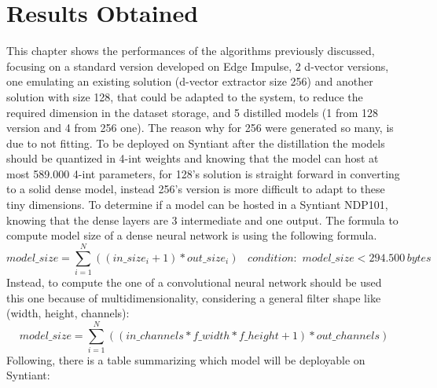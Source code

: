 \chapter{Results Obtained}
\label{cha:results obtained}
This chapter shows the performances of the algorithms previously discussed, focusing on a standard version developed on Edge Impulse\cite{edge_impulse_kws_example}, 2 d-vector versions, one emulating an existing solution\cite{TinySV} (d-vector extractor size 256) and another solution with size 128, that could be adapted to the system, to reduce the required dimension in the dataset storage, and 5 distilled models (1 from 128 version and 4 from 256 one). The reason why for 256 were generated so many, is due to not fitting. To be deployed on Syntiant after the distillation the models should be quantized in 4-int weights and knowing that the model can host at most 589.000 4-int parameters, for 128's solution is straight forward in converting to a solid dense model, instead 256's version is more difficult to adapt to these tiny dimensions. To determine if a model can be hosted in a Syntiant NDP101, knowing that the dense layers are 3 intermediate and one output. The formula to compute model size of a dense neural network is using the following formula.
\begin{equation*}
    model\_size=\sum_{i=1}^{N}((in\_size_i+1)*out\_size_i)\,\,\,\,\,condition:\,\,model\_size<294.500\,bytes
\end{equation*} 
Instead, to compute the one of a convolutional neural network should be used this one because of multidimensionality, considering a general filter shape like (width, height, channels):
\begin{equation*}
    model\_size=\sum_{i=1}^{N}((in\_channels*f\_width*f\_height+1)*out\_channels)
\end{equation*}
Following, there is a table summarizing which model will be deployable on Syntiant:
